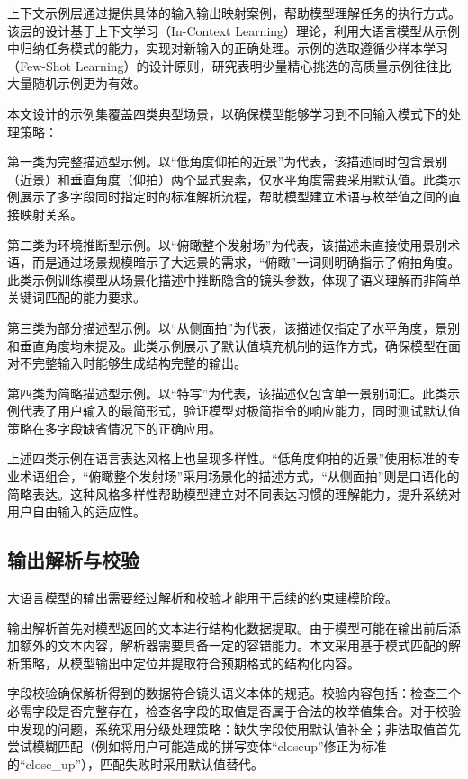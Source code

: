 上下文示例层通过提供具体的输入输出映射案例，帮助模型理解任务的执行方式。该层的设计基于上下文学习（In-Context Learning）理论\cite{brown2020language}，利用大语言模型从示例中归纳任务模式的能力，实现对新输入的正确处理。示例的选取遵循少样本学习（Few-Shot Learning）的设计原则，研究表明少量精心挑选的高质量示例往往比大量随机示例更为有效。

本文设计的示例集覆盖四类典型场景，以确保模型能够学习到不同输入模式下的处理策略：

第一类为完整描述型示例。以“低角度仰拍的近景”为代表，该描述同时包含景别（近景）和垂直角度（仰拍）两个显式要素，仅水平角度需要采用默认值。此类示例展示了多字段同时指定时的标准解析流程，帮助模型建立术语与枚举值之间的直接映射关系。

第二类为环境推断型示例。以“俯瞰整个发射场”为代表，该描述未直接使用景别术语，而是通过场景规模暗示了大远景的需求，“俯瞰”一词则明确指示了俯拍角度。此类示例训练模型从场景化描述中推断隐含的镜头参数，体现了语义理解而非简单关键词匹配的能力要求。

第三类为部分描述型示例。以“从侧面拍”为代表，该描述仅指定了水平角度，景别和垂直角度均未提及。此类示例展示了默认值填充机制的运作方式，确保模型在面对不完整输入时能够生成结构完整的输出。

第四类为简略描述型示例。以“特写”为代表，该描述仅包含单一景别词汇。此类示例代表了用户输入的最简形式，验证模型对极简指令的响应能力，同时测试默认值策略在多字段缺省情况下的正确应用。

上述四类示例在语言表达风格上也呈现多样性。“低角度仰拍的近景”使用标准的专业术语组合，“俯瞰整个发射场”采用场景化的描述方式，“从侧面拍”则是口语化的简略表达。这种风格多样性帮助模型建立对不同表达习惯的理解能力，提升系统对用户自由输入的适应性。

\subsection{输出解析与校验}

大语言模型的输出需要经过解析和校验才能用于后续的约束建模阶段。

输出解析首先对模型返回的文本进行结构化数据提取。由于模型可能在输出前后添加额外的文本内容，解析器需要具备一定的容错能力。本文采用基于模式匹配的解析策略，从模型输出中定位并提取符合预期格式的结构化内容。

字段校验确保解析得到的数据符合镜头语义本体的规范。校验内容包括：检查三个必需字段是否完整存在，检查各字段的取值是否属于合法的枚举值集合。对于校验中发现的问题，系统采用分级处理策略：缺失字段使用默认值补全；非法取值首先尝试模糊匹配（例如将用户可能造成的拼写变体“closeup”修正为标准的“close\_up”），匹配失败时采用默认值替代。


